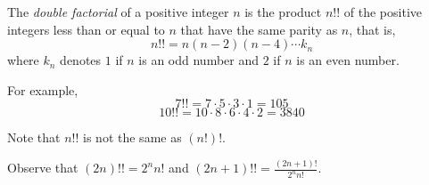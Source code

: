 \documentclass[12pt]{article}
\begin{document}
The \emph{double factorial} of a positive integer $n$ is the product $n!!$ of the positive integers less than or equal to $n$ that have the same parity as $n$, that is,
\[n!! = n (n-2) (n-4)\cdots k_n\]
where $k_n$ denotes $1$ if $n$ is an odd number and $2$ if $n$ is an even number.

For example,
\[ 7!! = 7 \cdot 5 \cdot 3 \cdot 1 = 105 \]
\[ 10!! = 10\cdot 8\cdot 6\cdot 4\cdot 2 = 3840 \]

Note that $n!!$ is not the same as $(n!)!$.

Observe that $(2n)!! = 2^n n!$ and $(2n+1)!! = \frac{(2n+1)!}{2^n n!}$.
\end{document}
